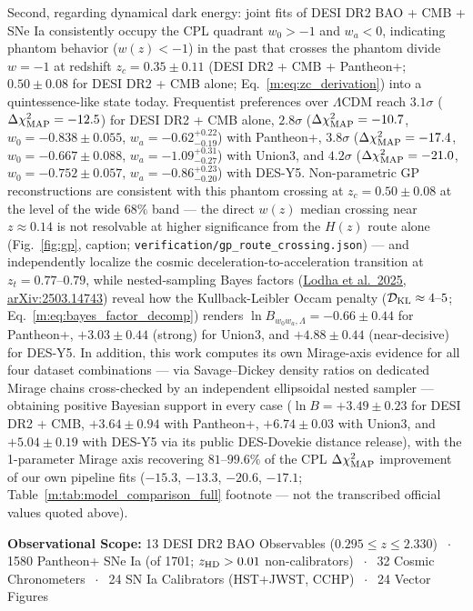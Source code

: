 \documentclass[aps,prd,preprint,superscriptaddress,nofootinbib]{revtex4-2}
\begin{document}
{Second, regarding dynamical dark energy: joint fits of DESI DR2 BAO + CMB + SNe Ia consistently occupy the CPL quadrant $w_0 > -1$ and $w_a < 0$, indicating phantom behavior ($w(z) < -1$) in the past that crosses the phantom divide $w = -1$ at redshift $z_c = 0.35 \pm 0.11$ (DESI DR2 + CMB + Pantheon+; $0.50 \pm 0.08$ for DESI DR2 + CMB alone; Eq.~\ref{m:eq:zc_derivation}) into a quintessence-like state today. Frequentist preferences over $\Lambda$CDM reach $3.1\sigma$ ($\Delta\chi^2_{\rm MAP} = -12.5$) for DESI DR2 + CMB alone, $2.8\sigma$ ($\Delta\chi^2_{\rm MAP} = -10.7$, $w_0 = -0.838 \pm 0.055$, $w_a = -0.62^{+0.22}_{-0.19}$) with Pantheon+, $3.8\sigma$ ($\Delta\chi^2_{\rm MAP} = -17.4$, $w_0 = -0.667 \pm 0.088$, $w_a = -1.09^{+0.31}_{-0.27}$) with Union3, and $4.2\sigma$ ($\Delta\chi^2_{\rm MAP} = -21.0$, $w_0 = -0.752 \pm 0.057$, $w_a = -0.86^{+0.23}_{-0.20}$) with DES-Y5. Non-parametric GP reconstructions are consistent with this phantom crossing at $z_c = 0.50 \pm 0.08$ at the level of the wide $68\%$ band --- the direct $w(z)$ median crossing near $z \approx 0.14$ is not resolvable at higher significance from the $H(z)$ route alone (Fig.~\ref{fig:gp}, caption; \texttt{verification/gp\_route\_crossing.json}) --- and independently localize the cosmic deceleration-to-acceleration transition at $z_t = 0.77\text{--}0.79$, while nested-sampling Bayes factors (\href{https://arxiv.org/abs/2503.14743}{Lodha et al.\ 2025, arXiv:2503.14743}) reveal how the Kullback-Leibler Occam penalty ($\mathcal{D}_{\rm KL} \approx 4\text{--}5$; Eq.~\ref{m:eq:bayes_factor_decomp}) renders $\ln B_{w_0w_a,\Lambda} = -0.66 \pm 0.44$ for Pantheon+, $+3.03 \pm 0.44$ (strong) for Union3, and $+4.88 \pm 0.44$ (near-decisive) for DES-Y5. In addition, this work computes its own Mirage-axis evidence for all four dataset combinations --- via Savage--Dickey density ratios on dedicated Mirage chains cross-checked by an independent ellipsoidal nested sampler --- obtaining positive Bayesian support in every case ($\ln B = +3.49 \pm 0.23$ for DESI DR2 + CMB, $+3.64 \pm 0.94$ with Pantheon+, $+6.74 \pm 0.03$ with Union3, and $+5.04 \pm 0.19$ with DES-Y5 via its public DES-Dovekie distance release), with the 1-parameter Mirage axis recovering $81\text{--}99.6\%$ of the CPL $\Delta\chi^2_{\rm MAP}$ improvement of our own pipeline fits ($-15.3$, $-13.3$, $-20.6$, $-17.1$; Table~\ref{m:tab:model_comparison_full} footnote --- not the transcribed official values quoted above).
}
\vspace{2pt}
\noindent\colorbox{boxbg}{%
\parbox{\dimexpr\textwidth-2\fboxsep\relax}{%
\centering\footnotesize\color{primary}%
\textbf{Observational Scope:} 13 DESI DR2 BAO Observables ($0.295 \le z \le 2.330$) $\;\cdot\;$ 1580 Pantheon+ SNe Ia (of 1701; $z_{\rm HD} > 0.01$ non-calibrators) $\;\cdot\;$ 32 Cosmic Chronometers $\;\cdot\;$ 24 SN Ia Calibrators (HST+JWST, CCHP) $\;\cdot\;$ 24 Vector Figures%
}%
}
\vspace{4pt}
\noindent{\color{goldaccent}\rule{\textwidth}{1.2pt}}
\end{document}
